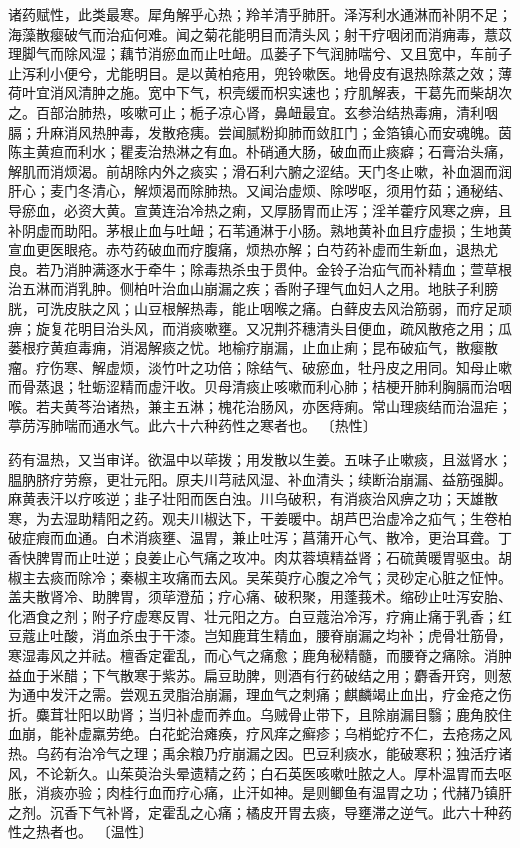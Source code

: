 \documentclass[a4paper,12pt,UTF8,twoside]{ctexbook}
\begin{document}
诸药赋性，此类最寒。犀角解乎心热；羚羊清乎肺肝。泽泻利水通淋而补阴不足；海藻散瘿破气而治疝何难。闻之菊花能明目而清头风；射干疗咽闭而消痈毒，薏苡理脚气而除风湿；藕节消瘀血而止吐衄。瓜蒌子下气润肺喘兮、又且宽中，车前子止泻利小便兮，尤能明目。是以黄柏疮用，兜铃嗽医。地骨皮有退热除蒸之效；薄荷叶宜消风清肿之施。宽中下气，枳壳缓而枳实速也；疗肌解表，干葛先而柴胡次之。百部治肺热，咳嗽可止；栀子凉心肾，鼻衄最宜。玄参治结热毒痈，清利咽膈；升麻消风热肿毒，发散疮痍。尝闻腻粉抑肺而敛肛门；金箔镇心而安魂魄。茵陈主黄疸而利水；瞿麦治热淋之有血。朴硝通大肠，破血而止痰癖；石膏治头痛，解肌而消烦渴。前胡除内外之痰实；滑石利六腑之涩结。天门冬止嗽，补血涸而润肝心；麦门冬清心，解烦渴而除肺热。又闻治虚烦、除哕呕，须用竹茹；通秘结、导瘀血，必资大黄。宣黄连治冷热之痢，又厚肠胃而止泻；淫羊藿疗风寒之痹，且补阴虚而助阳。茅根止血与吐衄；石苇通淋于小肠。熟地黄补血且疗虚损；生地黄宣血更医眼疮。赤芍药破血而疗腹痛，烦热亦解；白芍药补虚而生新血，退热尤良。若乃消肿满逐水于牵牛；除毒热杀虫于贯仲。金铃子治疝气而补精血；萱草根治五淋而消乳肿。侧柏叶治血山崩漏之疾；香附子理气血妇人之用。地肤子利膀胱，可洗皮肤之风；山豆根解热毒，能止咽喉之痛。白藓皮去风治筋弱，而疗足顽痹；旋复花明目治头风，而消痰嗽壅。又况荆芥穗清头目便血，疏风散疮之用；瓜蒌根疗黄疸毒痈，消渴解痰之忧。地榆疗崩漏，止血止痢；昆布破疝气，散瘿散瘤。疗伤寒、解虚烦，淡竹叶之功倍；除结气、破瘀血，牡丹皮之用同。知母止嗽而骨蒸退；牡蛎涩精而虚汗收。贝母清痰止咳嗽而利心肺；桔梗开肺利胸膈而治咽喉。若夫黄芩治诸热，兼主五淋；槐花治肠风，亦医痔痢。常山理痰结而治温疟；葶苈泻肺喘而通水气。此六十六种药性之寒者也。
〔热性〕

药有温热，又当审详。欲温中以荜拨；用发散以生姜。五味子止嗽痰，且滋肾水；腽肭脐疗劳瘵，更壮元阳。原夫川芎祛风湿、补血清头；续断治崩漏、益筋强脚。麻黄表汗以疗咳逆；韭子壮阳而医白浊。川乌破积，有消痰治风痹之功；天雄散寒，为去湿助精阳之药。观夫川椒达下，干姜暖中。胡芦巴治虚冷之疝气；生卷柏破症瘕而血通。白术消痰壅、温胃，兼止吐泻；菖蒲开心气、散冷，更治耳聋。丁香快脾胃而止吐逆；良姜止心气痛之攻冲。肉苁蓉填精益肾；石硫黄暖胃驱虫。胡椒主去痰而除冷；秦椒主攻痛而去风。吴茱萸疗心腹之冷气；灵砂定心脏之怔忡。盖夫散肾冷、助脾胃，须荜澄茄；疗心痛、破积聚，用蓬莪术。缩砂止吐泻安胎、化酒食之剂；附子疗虚寒反胃、壮元阳之方。白豆蔻治冷泻，疗痈止痛于乳香；红豆蔻止吐酸，消血杀虫于干漆。岂知鹿茸生精血，腰脊崩漏之均补；虎骨壮筋骨，寒湿毒风之并祛。檀香定霍乱，而心气之痛愈；鹿角秘精髓，而腰脊之痛除。消肿益血于米醋；下气散寒于紫苏。扁豆助脾，则酒有行药破结之用；麝香开窍，则葱为通中发汗之需。尝观五灵脂治崩漏，理血气之刺痛；麒麟竭止血出，疗金疮之伤折。麋茸壮阳以助肾；当归补虚而养血。乌贼骨止带下，且除崩漏目翳；鹿角胶住血崩，能补虚羸劳绝。白花蛇治瘫痪，疗风痒之癣疹；乌梢蛇疗不仁，去疮疡之风热。乌药有治冷气之理；禹余粮乃疗崩漏之因。巴豆利痰水，能破寒积；独活疗诸风，不论新久。山茱萸治头晕遗精之药；白石英医咳嗽吐脓之人。厚朴温胃而去呕胀，消痰亦验；肉桂行血而疗心痛，止汗如神。是则鲫鱼有温胃之功；代赭乃镇肝之剂。沉香下气补肾，定霍乱之心痛；橘皮开胃去痰，导壅滞之逆气。此六十种药性之热者也。
〔温性〕
\end{document}
